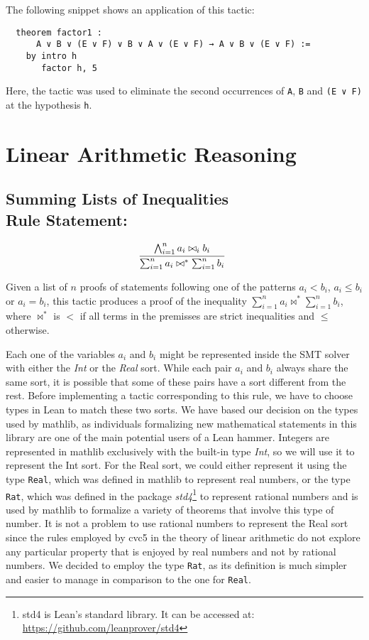 The following snippet shows an application of this tactic:

\begin{verbatim}
  theorem factor1 :
      A ∨ B ∨ (E ∨ F) ∨ B ∨ A ∨ (E ∨ F) → A ∨ B ∨ (E ∨ F) :=
    by intro h
       factor h, 5
\end{verbatim}

Here, the tactic was used to eliminate the second occurrences of \texttt{A}, \texttt{B} and
\texttt{(E ∨ F)} at the hypothesis \texttt{h}.

\section{Linear Arithmetic Reasoning}

\subsection*{Summing Lists of Inequalities\\Rule Statement:}
\[
  \infer[]{\sum_{i = 1}^{n} a_{i} \bowtie^{*} \sum_{i = 1}^{n} b_{i}}{\bigwedge_{i = 1}^{n} a_{i} \bowtie_{i} b_{i}}
\]

Given a list of $n$ proofs of statements following one of the patterns $a_{i} < b_{i}$, $a_{i} \le b_{i}$ or $a_{i} = b_{i}$, this
tactic produces a proof of the inequality $\sum_{i = 1}^{n} a_{i} \bowtie^{*} \sum_{i = 1}^{n} b_{i}$, where $\bowtie^{*}$ is $<$ if
all terms in the premisses are strict inequalities and $\le$ otherwise.

Each one of the variables $a_{i}$ and $b_{i}$ might be represented inside the SMT solver
with either the \textit{Int} or the \textit{Real} sort. While each pair $a_{i}$ and $b_{i}$ always share the same sort, it is possible that some of these pairs have a sort different from the rest. Before implementing a
tactic corresponding to this rule, we have to choose types in Lean to match
these two sorts. We have based our decision on the types used by mathlib, as
individuals formalizing new mathematical statements in this library are one of the main potential users
of a Lean hammer. Integers are represented in mathlib exclusively with the built-in type \textit{Int}, so we will use it to represent the Int sort.
For the Real sort, we could either represent it using the type \texttt{Real}, which was defined in mathlib
to represent real numbers, or the type \texttt{Rat}, which was defined in the package \textit{std4}\footnote{std4 is Lean's standard library. It can be accessed at: \url{https://github.com/leanprover/std4}} to
represent rational numbers and is used by mathlib to formalize a variety of theorems
that involve this type of number.
It is not a problem to use rational numbers to represent the Real sort since the rules employed by cvc5 in the theory of linear arithmetic
do not explore any particular property that is enjoyed by real numbers and not by
rational numbers.
We decided to employ the type \texttt{Rat}, as its definition is much simpler and easier
to manage in comparison to the one for \texttt{Real}.


